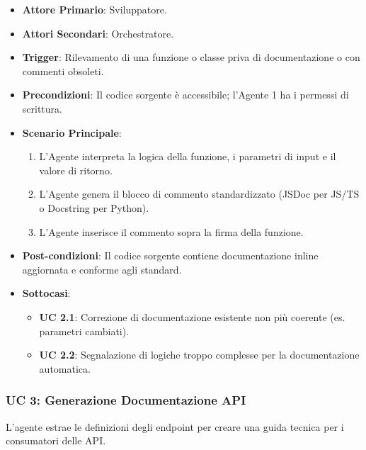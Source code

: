 \documentclass[12pt, a4paper]{article}
\begin{document}
\begin{itemize}
    \item \textbf{Attore Primario}: Sviluppatore.
    \item \textbf{Attori Secondari}: Orchestratore.
    \item \textbf{Trigger}: Rilevamento di una funzione o classe priva di documentazione o con commenti obsoleti.
    \item \textbf{Precondizioni}: Il codice sorgente è accessibile; l'Agente 1 ha i permessi di scrittura.
    \item \textbf{Scenario Principale}:
        \begin{enumerate}
            \item L'Agente interpreta la logica della funzione, i parametri di input e il valore di ritorno.
            \item L'Agente genera il blocco di commento standardizzato (JSDoc per JS/TS o Docstring per Python).
            \item L'Agente inserisce il commento sopra la firma della funzione.
        \end{enumerate}
    \item \textbf{Post-condizioni}: Il codice sorgente contiene documentazione inline aggiornata e conforme agli standard.
    \item \textbf{Sottocasi}:
        \begin{itemize}
            \item \textbf{UC 2.1}: Correzione di documentazione esistente non più coerente (es. parametri cambiati).
            \item \textbf{UC 2.2}: Segnalazione di logiche troppo complesse per la documentazione automatica.
        \end{itemize}
\end{itemize}

\subsubsection{UC 3: Generazione Documentazione API}
L'agente estrae le definizioni degli endpoint per creare una guida tecnica per i consumatori delle API.
\end{document}

